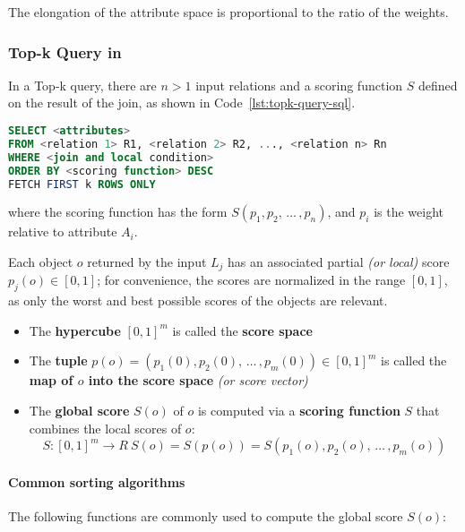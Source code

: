 \documentclass[english]{article}
\begin{document}
The elongation of the attribute space is proportional to the ratio of the weights.

\subsubsection{Top-k Query in \sql}

In a Top-k query, there are \(n > 1\) input relations and a scoring function \(S\) defined on the result of the join, as shown in Code~\ref{lst:topk-query-sql}.

\begin{lstlisting}[language=sql, morekeywords={FETCH}, caption={Top-k query in \sql}, label={lst:topk-query-sql}]
SELECT <attributes>
FROM <relation 1> R1, <relation 2> R2, ..., <relation n> Rn
WHERE <join and local condition>
ORDER BY <scoring function> DESC
FETCH FIRST k ROWS ONLY
\end{lstlisting}

where the scoring function has the form \(S(p_1, p_2, \,\ldots\,, p_n)\), and \(p_i\) is the weight relative to attribute \(A_i\).

Each object \(o\) returned by the input \(L_j\) has an associated partial \textit{(or local)} score \(p_j(o) \in \left[ 0, 1 \right]\);
for convenience, the scores are normalized in the range \([0, 1]\), as only the worst and best possible scores of the objects are relevant.

\begin{itemize}
  \item The \textbf{hypercube} \(\left[ 0, 1 \right]^m\) is called the \textbf{score space}
  \item The \textbf{tuple} \(p(o) = \left( p_1(0), p_2(0), \,\ldots\,, p_m(0) \right) \in \left[ 0, 1 \right]^m\) is called the \textbf{map of \(o\) into the score space} \textit{(or score vector)}
  \item The\textbf{ global score} \(S(o)\) of \(o\) is computed via a \textbf{scoring function} \(S\) that combines the local scores of \(o\):
        \[ S: \left[ 0, 1 \right]^m \rightarrow R \ S(o) = S\left( p(o) \right) = S\left( p_1(o), p_2(o), \,\ldots\,, p_m(o) \right) \]
\end{itemize}

\paragraph{Common sorting algorithms}

The following \sql functions are commonly used to compute the global score \(S(o)\):
\end{document}

